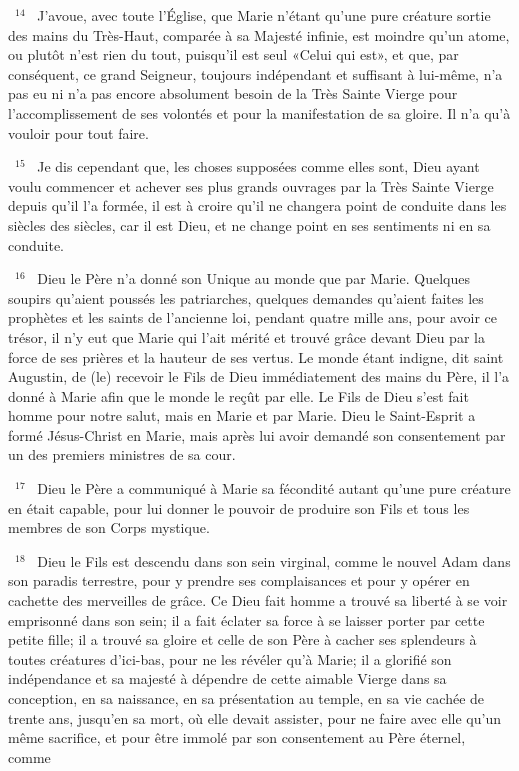\documentclass[paper=a5,pagesize=pdftex,fontsize=15pt,headinclude=on,twoside=off]{scrbook}
\newcommand{\negphantom}[1]{\settowidth{\dimen0}{#1}\hspace*{-\dimen0}}
\newcommand{\versenb}[1]{\par \vspace{10pt}~\negphantom{~${}^{#1}$~}${}^{#1}$~}
\begin{document}
\versenb{14} J'avoue, avec toute l'Église, que Marie n'étant qu'une pure créature sortie des mains du Très-Haut, comparée
à sa Majesté infinie, est moindre qu'un atome, ou plutôt n'est rien du tout, puisqu'il est seul «Celui qui est», et que,
par conséquent, ce grand Seigneur, toujours indépendant et suffisant à lui-même, n'a pas eu ni n'a pas encore
absolument besoin de la Très Sainte Vierge pour l'accomplissement de ses volontés et pour la manifestation de sa
gloire. Il n'a qu'à vouloir pour tout faire.
\versenb{15} Je dis cependant que, les choses supposées comme elles sont, Dieu ayant voulu commencer et achever ses
plus grands ouvrages par la Très Sainte Vierge depuis qu'il l'a formée, il est à croire qu'il ne changera point de
conduite dans les siècles des siècles, car il est Dieu, et ne change point en ses sentiments ni en sa conduite.
\versenb{16} Dieu le Père n'a donné son Unique au monde que par Marie. Quelques soupirs qu'aient poussés les
patriarches, quelques demandes qu'aient faites les prophètes et les saints de l'ancienne loi, pendant quatre mille
ans, pour avoir ce trésor, il n'y eut que Marie qui l'ait mérité et trouvé grâce devant Dieu par la force de ses prières
et la hauteur de ses vertus. Le monde étant indigne, dit saint Augustin, de (le) recevoir le Fils de Dieu
immédiatement des mains du Père, il l'a donné à Marie afin que le monde le reçût par elle.
Le Fils de Dieu s'est fait homme pour notre salut, mais en Marie et par Marie.
Dieu le Saint-Esprit a formé Jésus-Christ en Marie, mais après lui avoir demandé son consentement par un des
premiers ministres de sa cour.
\versenb{17} Dieu le Père a communiqué à Marie sa fécondité autant qu'une pure créature en était capable, pour lui donner
le pouvoir de produire son Fils et tous les membres de son Corps mystique.
\versenb{18} Dieu le Fils est descendu dans son sein virginal, comme le nouvel Adam dans son paradis terrestre, pour y
prendre ses complaisances et pour y opérer en cachette des merveilles de grâce. Ce Dieu fait homme a trouvé sa
liberté à se voir emprisonné dans son sein; il a fait éclater sa force à se laisser porter par cette petite fille; il a
trouvé sa gloire et celle de son Père à cacher ses splendeurs à toutes créatures d'ici-bas, pour ne les révéler qu'à
Marie; il a glorifié son indépendance et sa majesté à dépendre de cette aimable Vierge dans sa conception, en sa
naissance, en sa présentation au temple, en sa vie cachée de trente ans, jusqu'en sa mort, où elle devait assister,
pour ne faire avec elle qu'un même sacrifice, et pour être immolé par son consentement au Père éternel, comme
\end{document}
